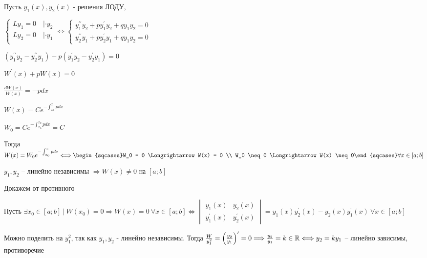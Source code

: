 \documentclass[12pt]{article}
\begin{document}
    \begin{MyProof}
        Пусть $y_1(x), y_2(x)$ - решения ЛОДУ,

        $\begin{cases}
            Ly_1 = 0 \quad | \cdot y_2 \\
            Ly_2 = 0 \quad | \cdot y_1 \\
        \end{cases} \Longleftrightarrow
        \begin{cases}
            y_1^{\prime\prime} y_2 + py_1^{\prime} y_2 + q y_1 y_2 = 0 \\
            y_2^{\prime\prime} y_1 + py_2^{\prime} y_1 + q y_1 y_2 = 0
        \end{cases}$

        $(y_1^{\prime\prime} y_2 - y_2^{\prime\prime} y_1) + p (y_1^{\prime} y_2 - y_2^{\prime} y_1) = 0$

        $W^\prime(x) + pW(x) = 0$

        $\frac{dW(x)}{W(x)} = -pdx$

        $W(x) = Ce^{-\int_{x_0}^x pdx}$

        $W_0 = Ce^{-\int^{x_0}_{x_0} pdx} = C$

        Тогда $W(x) = W_0 e^{-\int_{x_0}^x pdx} \Longleftrightarrow \begin{sqcases}W_0 = 0 \Longrightarrow W(x) = 0 \\ W_0 \neq 0 \Longrightarrow W(x) \neq 0\end{sqcases} \forall x \in [a;b]$

    \end{MyProof}

    \begin{MyTheorem}
         $y_1, y_2$ -- линейно независимы $\Longrightarrow W(x) \neq 0$ на $[a;b]$
    \end{MyTheorem}

    \begin{MyProof} 
        Докажем от противного

        Пусть $\exists x_0 \in [a;b] \ | \ W(x_0)= 0 \Longrightarrow W(x) = 0 \ \forall x \in [a;b] \Longleftrightarrow
        \begin{vmatrix}y_1(x) & y_2(x) \\ y_1^\prime(x) & y_2^\prime(x)\end{vmatrix} = y_1(x) y_2^\prime(x) - y_2(x) y_1^\prime(x) \ \forall x \in [a;b]$

        Можно поделить на $y_1^2$, так как $y_1, y_2$ - линейно независимы. Тогда $\frac{W}{y^2_1} = \left(\frac{y_2}{y_1}\right)^\prime = 0 \Longrightarrow \frac{y_2}{y_1} = k \in \mathbb{R} \Longleftrightarrow y_2 = k y_1$ -- линейно зависимы, противоречие
    \end{MyProof}
\end{document}
